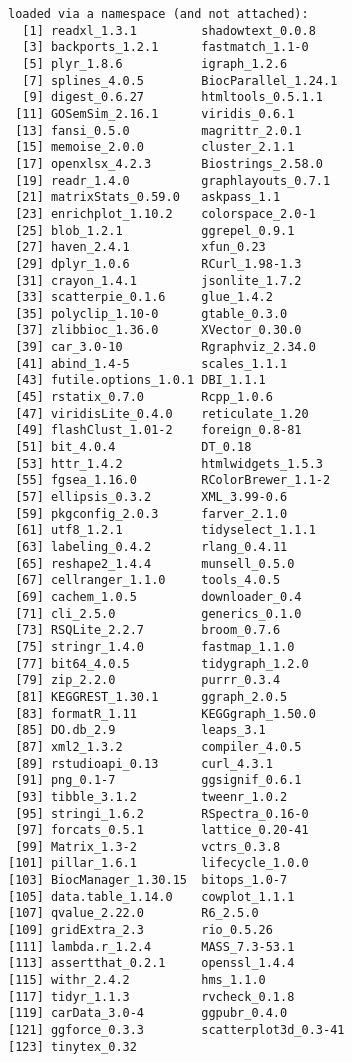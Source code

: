 \begin{lstlisting}
loaded via a namespace (and not attached):
  [1] readxl_1.3.1         shadowtext_0.0.8    
  [3] backports_1.2.1      fastmatch_1.1-0     
  [5] plyr_1.8.6           igraph_1.2.6        
  [7] splines_4.0.5        BiocParallel_1.24.1 
  [9] digest_0.6.27        htmltools_0.5.1.1   
 [11] GOSemSim_2.16.1      viridis_0.6.1       
 [13] fansi_0.5.0          magrittr_2.0.1      
 [15] memoise_2.0.0        cluster_2.1.1       
 [17] openxlsx_4.2.3       Biostrings_2.58.0   
 [19] readr_1.4.0          graphlayouts_0.7.1  
 [21] matrixStats_0.59.0   askpass_1.1         
 [23] enrichplot_1.10.2    colorspace_2.0-1    
 [25] blob_1.2.1           ggrepel_0.9.1       
 [27] haven_2.4.1          xfun_0.23           
 [29] dplyr_1.0.6          RCurl_1.98-1.3      
 [31] crayon_1.4.1         jsonlite_1.7.2      
 [33] scatterpie_0.1.6     glue_1.4.2          
 [35] polyclip_1.10-0      gtable_0.3.0        
 [37] zlibbioc_1.36.0      XVector_0.30.0      
 [39] car_3.0-10           Rgraphviz_2.34.0    
 [41] abind_1.4-5          scales_1.1.1        
 [43] futile.options_1.0.1 DBI_1.1.1           
 [45] rstatix_0.7.0        Rcpp_1.0.6          
 [47] viridisLite_0.4.0    reticulate_1.20     
 [49] flashClust_1.01-2    foreign_0.8-81      
 [51] bit_4.0.4            DT_0.18             
 [53] httr_1.4.2           htmlwidgets_1.5.3   
 [55] fgsea_1.16.0         RColorBrewer_1.1-2  
 [57] ellipsis_0.3.2       XML_3.99-0.6        
 [59] pkgconfig_2.0.3      farver_2.1.0        
 [61] utf8_1.2.1           tidyselect_1.1.1    
 [63] labeling_0.4.2       rlang_0.4.11        
 [65] reshape2_1.4.4       munsell_0.5.0       
 [67] cellranger_1.1.0     tools_4.0.5         
 [69] cachem_1.0.5         downloader_0.4      
 [71] cli_2.5.0            generics_0.1.0      
 [73] RSQLite_2.2.7        broom_0.7.6         
 [75] stringr_1.4.0        fastmap_1.1.0       
 [77] bit64_4.0.5          tidygraph_1.2.0     
 [79] zip_2.2.0            purrr_0.3.4         
 [81] KEGGREST_1.30.1      ggraph_2.0.5        
 [83] formatR_1.11         KEGGgraph_1.50.0    
 [85] DO.db_2.9            leaps_3.1           
 [87] xml2_1.3.2           compiler_4.0.5      
 [89] rstudioapi_0.13      curl_4.3.1          
 [91] png_0.1-7            ggsignif_0.6.1      
 [93] tibble_3.1.2         tweenr_1.0.2        
 [95] stringi_1.6.2        RSpectra_0.16-0     
 [97] forcats_0.5.1        lattice_0.20-41     
 [99] Matrix_1.3-2         vctrs_0.3.8         
[101] pillar_1.6.1         lifecycle_1.0.0     
[103] BiocManager_1.30.15  bitops_1.0-7        
[105] data.table_1.14.0    cowplot_1.1.1       
[107] qvalue_2.22.0        R6_2.5.0            
[109] gridExtra_2.3        rio_0.5.26          
[111] lambda.r_1.2.4       MASS_7.3-53.1       
[113] assertthat_0.2.1     openssl_1.4.4       
[115] withr_2.4.2          hms_1.1.0           
[117] tidyr_1.1.3          rvcheck_0.1.8       
[119] carData_3.0-4        ggpubr_0.4.0        
[121] ggforce_0.3.3        scatterplot3d_0.3-41
[123] tinytex_0.32        
\end{lstlisting}

